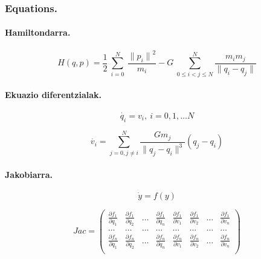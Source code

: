 \subsubsection*{Equations.}

\paragraph*{Hamiltondarra.}

\begin{equation}
H(q,p)=\frac{1}{2}\ \sum^N_{i=0}{\ \frac{{\|p_i\|}^2}{m_i}}-G\ \sum^N_{0\le i<j\le N}{\frac{m_im_j}{\|q_i-q_j\|}} 
\end{equation}


\paragraph*{Ekuazio diferentzialak.}

\begin{equation}
\dot{q_i}=v_i, \  i=0,1,\dots N
\end{equation}

\begin{equation}
\dot{v_i}= \sum_{j=0,j \neq i}^{N} \frac{Gm_j}{\|q_j-q_i\|^3} (q_j-q_i)
\end{equation}

\paragraph{Jakobiarra.}

\begin{equation*}
\dot{y}=f(y)
\end{equation*}

\begin{equation}
Jac=\left(\begin{array}{cccccccc}
    \frac{\partial f_1}{\partial q_1} & \frac{\partial f_1}{\partial q_2} & \dots & \frac{\partial f_1}{\partial q_n} &
    \frac{\partial f_1}{\partial v_1} & \frac{\partial f_1}{\partial v_2} & \dots & \frac{\partial f_1}{\partial v_n}\\
    
    \dots & \dots & \dots & \dots & \dots & \dots & \dots & \dots \\
    
    \frac{\partial f_n}{\partial q_1} & \frac{\partial f_n}{\partial q_2} & \dots & \frac{\partial f_n}{\partial q_n} &
    \frac{\partial f_n}{\partial v_1} & \frac{\partial f_n}{\partial v_2} & \dots & \frac{\partial f_n}{\partial v_n}\\
  \end{array}\right)
\end{equation}

